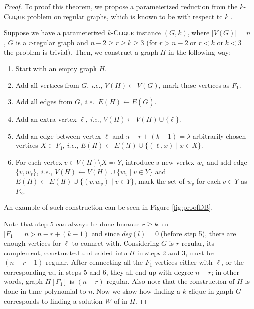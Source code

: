 \begin{proof}\label{proofDB}
    To proof this theorem, we propose a parameterized reduction from the $k$-\textsc{Clique} problem on regular graphs,
    which is known to be \Wh with respect to $k$ \cite{Mathieson2008}.
    
    Suppose we have a parameterized $k$-\textsc{Clique} instance $(G, k)$, where $|V(G)|=n$, $G$ is a $r$-regular graph and $n-2 \geq r \geq k \geq 3$
    (for $r > n-2$ or $r < k$ or $k < 3$ the problem is trivial).
    Then, we construct a graph $H$ in the following way:
    \begin{enumerate}
        \item Start with an empty graph $H$.
        \item Add all vertices from $G$, \emph{i.e.}, $V(H) \leftarrow V(G)$, mark these vertices as $F_1$.
        \item Add all edges from $\overline{G}$, \emph{i.e.}, $E(H) \leftarrow E(\overline{G})$.
        \item Add an extra vertex $\ell$, \emph{i.e.}, $V(H) \leftarrow V(H) \cup \{\ell\}$.
        \item Add an edge between vertex $\ell$ and $n - r + (k - 1) = \lambda$ arbitrarily chosen vertices $X \subset F_1$,
        \emph{i.e.}, $E(H) \leftarrow E(H) \cup \{ (\ell, x) \mid x \in X \}$.
        \item For each vertex $v \in V(H) \setminus X \eqqcolon Y$, introduce a new vertex $w_v$ and add edge $\{v, w_v\}$, \emph{i.e.},
              $V(H) \leftarrow V(H) \cup \{ w_v \mid v \in Y \}$ and $E(H) \leftarrow E(H) \cup \{ (v, w_v) \mid v \in Y \}$,
              mark the set of $w_v$ for each $v \in Y$ as $F_2$.
    \end{enumerate}
    An example of such construction can be seen in Figure \ref{fig:proofDB}.

    Note that step 5 can always be done because $r \ge k$, so $|F_1| = n > n - r + (k - 1)$
    and since $deg(l) = 0$ (before step 5), there are enough vertices for $\ell$ to connect with.
    Considering $G$ is $r$-regular, its complement, constructed and added into $H$ in steps 2 and 3, must be $(n-r-1)$-regular.
    After connecting all the $F_1$ vertices either with $\ell$, or the corresponding $w_v$ in steps 5 and 6,
    they all end up with degree $n-r$; in other words, graph $H[F_1]$ is $(n-r)$-regular.
    Also note that the construction of $H$ is done in time polynomial to $n$.
    Now we show how finding a $k$-clique in graph $G$ corresponds to finding a solution $W$ of \HLshort in $H$.


\end{proof}
